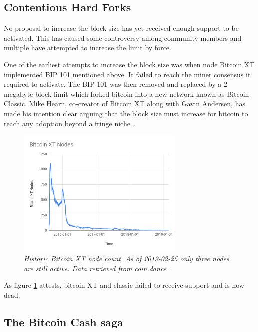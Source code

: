 \subsection{Contentious Hard Forks}

No proposal to increase the block size has yet received enough support to be activated. This has caused some controversy among community members and multiple have attempted to increase the limit by force. 

One of the earliest attempts to increase the block size was when node Bitcoin XT implemented BIP 101 mentioned above. It failed to reach the miner consensus it required to activate. The BIP 101 was then removed and replaced by a 2 megabyte block limit which forked bitcoin into a new network known as Bitcoin Classic. Mike Hearn, co-creator of Bitcoin XT along with Gavin Andersen, has made his intention clear arguing that the block size must increase for bitcoin to reach any adoption beyond a fringe niche~\cite{hearn:classic}. 

\begin{figure}[!htb]
	\hspace*{-0.7cm} 
	\centering
	\includegraphics[width=8cm]{external/Bitcoin_XT_Nodes.png}
	\caption{\textit{Historic Bitcoin XT node count. As of 2019-02-25 only three nodes are still active. Data retrieved from coin.dance~\cite{coin:dance}.}}
	\label{fig:xt_nodes}
	\hspace*{2mm} 	
\end{figure}

As figure \ref{fig:xt_nodes} attests, bitcoin XT and classic failed to receive support and is now dead.

\subsection{The Bitcoin Cash saga}

